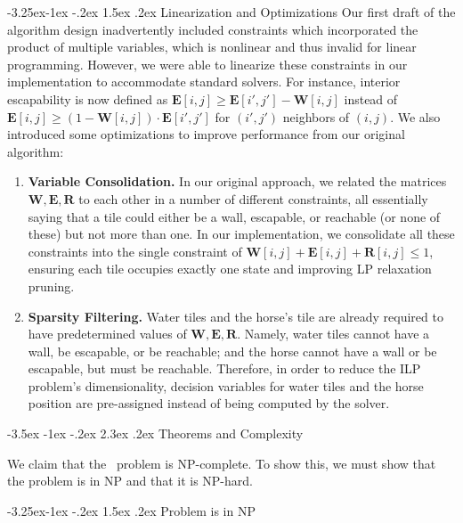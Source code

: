 \documentclass[sigconf,nonacm]{acmart}
\makeatletter
\renewcommand{\section}{\@startsection{section}{1}{\z@}%
  {-3.5ex \@plus -1ex \@minus -.2ex}%
  {2.3ex \@plus.2ex}%
  {\reset@font\Large\bfseries}}
\renewcommand{\subsection}{\@startsection{subsection}{2}{\z@}%
  {-3.25ex\@plus -1ex \@minus -.2ex}%
  {1.5ex \@plus .2ex}%
  {\reset@font\large\bfseries}}
\makeatother
\begin{document}
\subsection{Linearization and Optimizations}
Our first draft of the algorithm design inadvertently included constraints which incorporated the product of multiple variables, which is nonlinear and thus invalid for linear programming. However, we were able to linearize these constraints in our implementation to accommodate standard solvers. For instance, interior escapability is now defined as $\mathbf{E}[i,j] \geq \mathbf{E}[i',j']-\mathbf{W}[i,j]$ instead of $\mathbf{E}[i,j] \geq (1 - \mathbf{W}[i,j]) \cdot \mathbf{E}[i',j']$ for $(i',j')$ neighbors of $(i,j)$. We also introduced some optimizations to improve performance from our original algorithm:
\begin{enumerate}
    \item \textbf{Variable Consolidation.} In our original approach, we related the matrices $\mathbf{W},\mathbf{E},\mathbf{R}$ to each other in a number of different constraints, all essentially saying that a tile could either be a wall, escapable, or reachable (or none of these) but not more than one. In our implementation, we consolidate all these constraints into the single constraint of $\mathbf{W}[i,j]+\mathbf{E}[i,j]+\mathbf{R}[i,j] \leq 1$, ensuring each tile occupies exactly one state and improving LP relaxation pruning.
    \item \textbf{Sparsity Filtering.} Water tiles and the horse's tile are already required to have predetermined values of $\mathbf{W},\mathbf{E},\mathbf{R}$. Namely, water tiles cannot have a wall, be escapable, or be reachable; and the horse cannot have a wall or be escapable, but must be reachable. Therefore, in order to reduce the ILP problem's dimensionality, decision variables for water tiles and the horse position are pre-assigned instead of being computed by the solver.
\end{enumerate}

\section{Theorems and Complexity}

We claim that the \horse\ problem is NP-complete. To show this, we must show that the problem is in NP and that it is NP-hard.

\subsection{Problem is in NP}
\end{document}
